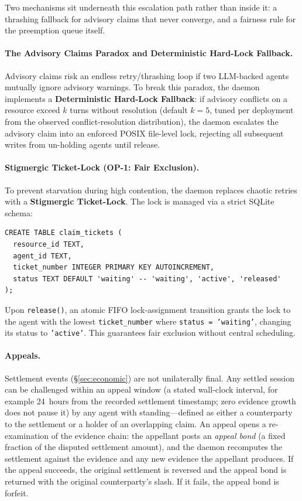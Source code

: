 \documentclass[11pt,a4paper]{article}
\theoremstyle{definition}
\theoremstyle{remark}
\begin{document}


Two mechanisms sit underneath this escalation path rather than inside it: a thrashing fallback for advisory claims that never converge, and a fairness rule for the preemption queue itself.

\paragraph{The Advisory Claims Paradox and Deterministic Hard-Lock Fallback.}
Advisory claims risk an endless retry/thrashing loop if two LLM-backed agents mutually ignore advisory warnings. To break this paradox, the daemon implements a \textbf{Deterministic Hard-Lock Fallback}: if advisory conflicts on a resource exceed $k$ turns without resolution (default $k = 5$, tuned per deployment from the observed conflict-resolution distribution), the daemon escalates the advisory claim into an enforced POSIX file-level lock, rejecting all subsequent writes from un-holding agents until release.

\paragraph{Stigmergic Ticket-Lock (OP-1: Fair Exclusion).}
To prevent starvation during high contention, the daemon replaces chaotic retries with a \textbf{Stigmergic Ticket-Lock}. The lock is managed via a strict SQLite schema:
\begin{lstlisting}[style=pdcode]
CREATE TABLE claim_tickets (
  resource_id TEXT,
  agent_id TEXT,
  ticket_number INTEGER PRIMARY KEY AUTOINCREMENT,
  status TEXT DEFAULT 'waiting' -- 'waiting', 'active', 'released'
);
\end{lstlisting}
Upon \texttt{release()}, an atomic FIFO lock-assignment transition grants the lock to the agent with the lowest \texttt{ticket\_number} where \texttt{status = 'waiting'}, changing its status to \texttt{'active'}. This guarantees fair exclusion without central scheduling.

\paragraph{Appeals.} Settlement events (\S\ref{sec:economic}) are not unilaterally final. Any settled session can be challenged within an appeal window (a stated wall-clock interval, for example 24~hours from the recorded settlement timestamp; zero evidence growth does not pause it) by any agent with standing---defined as either a counterparty to the settlement or a holder of an overlapping claim. An appeal opens a re-examination of the evidence chain: the appellant posts an \emph{appeal bond} (a fixed fraction of the disputed settlement amount), and the daemon recomputes the settlement against the evidence and any new evidence the appellant produces. If the appeal succeeds, the original settlement is reversed and the appeal bond is returned with the original counterparty's slash. If it fails, the appeal bond is forfeit.
\end{document}
